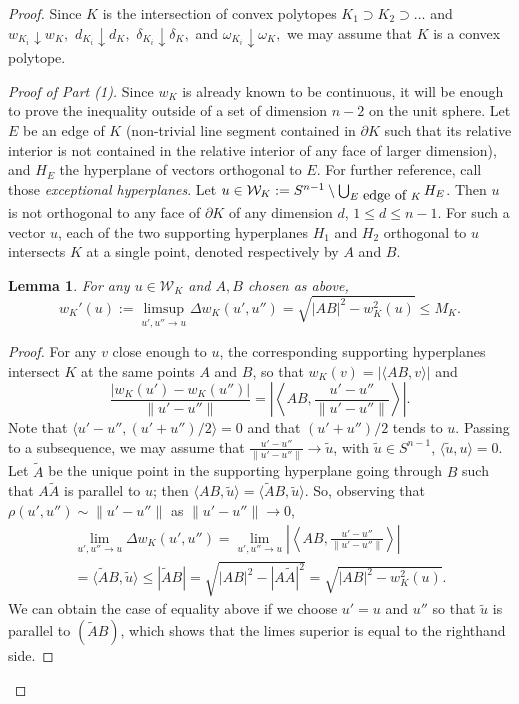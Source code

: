 \documentclass[10pt,a4paper]{amsart}
\newtheorem{lemma}{Lemma}
\def\d{\delta}
\def\om{\omega}
\begin{document}
\begin{proof}

Since $K$ is the intersection of convex polytopes $K_1\supset K_2\supset\dots$
and $w_{K_i}\downarrow w_K,$ $d_{K_i}\downarrow d_K,$ $\d_{K_i}\downarrow\d_K,$ and
$\om_{K_i}\downarrow\om_K,$ we may assume that $K$ is a convex polytope.
\smallskip

{\it Proof of Part (1).} Since $w_K$ is already known to be
continuous, it will be enough to prove the inequality outside of a
set of dimension $n-2$ on the unit sphere. Let $E$ be an edge of
$K$ (non-trivial line segment contained in $\partial K$ such that
its relative interior is not contained in the relative interior of
any face of larger dimension), and $H_E$ the  hyperplane of
vectors orthogonal to $E$. For further reference, call those
\emph{exceptional hyperplanes}. Let $u\in \mathcal W_K := S^{n-1}
\setminus \bigcup_{E \mbox{ \small edge of }K} H_E$.  Then $u$ is
not orthogonal to any face of $\partial K$ of any dimension $d$,
$1\le d\le n-1$. For such a vector $u$, each of the two supporting
hyperplanes $H_1$ and $H_2$ orthogonal to $u$ intersects $K$ at a
single point, denoted respectively by $A$ and $B$.

\begin{lemma}
\label{limw}
For any $u \in \mathcal W_K$ and $A, B$ chosen as above,
\[
w_K'(u):= \limsup_{u',u''\to u} \Delta w_K(u',u'')
= \sqrt{|AB|^2-w^2_K(u)} \le M_K.
\]
\end{lemma}
\begin{proof}
For any $v$ close enough to $u$, the corresponding supporting
hyperplanes intersect $K$ at the same points $A$ and $B$, so that
$w_K(v)= |\langle AB, v\rangle|$ and
\[
\frac{|w_K(u')-w_K(u'')|}{\|u'-u''\|} = \left| \left\langle AB, \frac{u'-u''}{\|u'-u''\|}\right\rangle\right|.
\]
Note that $\langle u'-u'', (u'+u'')/2 \rangle=0$ and that $(u'+u'')/2$ tends to $u$.
Passing to a subsequence, we may assume that $\frac{u'-u''}{\|u'-u''\|} \to \tilde u$, with
$\tilde u \in S^{n-1}$, $\langle \tilde u, u \rangle=0$.
Let $\tilde A$ be the
unique point in  the supporting hyperplane going through $B$
such that $A\tilde A$ is parallel to $u$; then $\langle AB, \tilde u\rangle = \langle \tilde AB, \tilde u\rangle$.
So, observing that $\rho(u',u'') \sim \|u'-u''\|$ as $\|u'-u''\|\to0$,
\begin{multline*}
\lim_{u',u''\to u} \Delta w_K(u',u'') =
\lim_{u',u''\to u}\left| \left\langle AB, \frac{u'-u''}{\|u'-u''\|}\right\rangle\right|
\\
= \langle \tilde AB, \tilde u\rangle \le |\tilde AB| = \sqrt{|AB|^2-|A\tilde A|^2} =
\sqrt{|AB|^2-w^2_K(u)}.
\end{multline*}
We can obtain the case of equality above if we choose $u'=u$ and $u''$ so that $\tilde u$
is parallel to $(\tilde A B)$, which shows that the limes superior is equal to the righthand
side.
\end{proof}


\end{proof}
\end{document}

